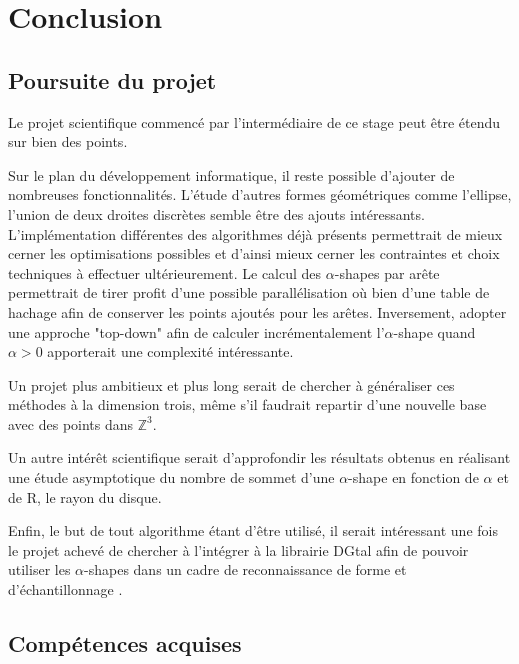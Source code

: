 \section{Conclusion}

\subsection{Poursuite du projet}

Le projet scientifique commencé par l'intermédiaire de ce stage peut être étendu sur bien des points. 

Sur le plan du développement informatique, il reste possible d'ajouter de nombreuses fonctionnalités. L’étude d'autres formes géométriques comme l'ellipse, l'union de deux droites discrètes semble être des ajouts intéressants. L'implémentation différentes des algorithmes déjà présents permettrait de mieux cerner les optimisations possibles et d'ainsi mieux cerner les contraintes et choix techniques à effectuer ultérieurement. Le calcul des $\alpha$-shapes par arête permettrait de tirer profit d'une possible parallélisation où bien d'une table de hachage afin de conserver les points ajoutés pour les arêtes. Inversement, adopter une approche "top-down" afin de calculer incrémentalement l'$\alpha$-shape quand $\alpha > 0$ apporterait une complexité intéressante.

Un projet plus ambitieux et plus long serait de chercher à généraliser ces méthodes à la dimension trois, même s'il faudrait repartir d'une nouvelle base avec des points dans $\mathbb{Z}^{3}$. 

Un autre intérêt scientifique serait d'approfondir les résultats obtenus en réalisant une étude asymptotique du nombre de sommet d'une $\alpha$-shape en fonction de $\alpha$ et de R, le rayon du disque.

Enfin, le but de tout algorithme étant d'être utilisé, il serait intéressant une fois le projet achevé de chercher à l'intégrer à la librairie DGtal afin de pouvoir utiliser les $\alpha$-shapes dans un cadre de reconnaissance de forme et d’échantillonnage \cite{BernardiniB97}.


\subsection{Compétences acquises}

